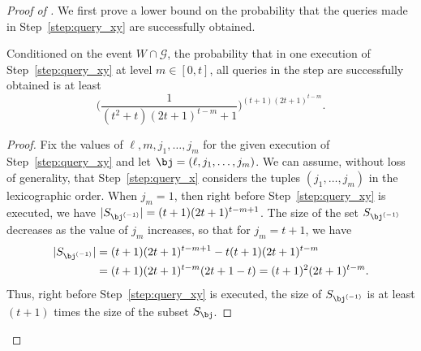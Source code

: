 \documentclass{toc}
\begin{document}
\begin{proof}[Proof of ]
    We first prove a lower bound on the probability that the queries made in Step~\ref{step:query_xy} are successfully obtained.
\begin{claim}\label{clm:connect}
Conditioned on the event $W\cap \mathcal{G}$, the probability that in one execution of Step~\ref{step:query_xy} at level $m \in [0,t]$, all queries in the step are successfully obtained is at least
\begin{equation*}
    \Big(\frac{1}{(t^2+t)(2t+1)^{t-m}+1} \Big)^{(t+1)(2t+1)^{t-m}}.
\end{equation*}
\end{claim}
\begin{proof}
Fix the values of $\ell,m, j_1, \dots, j_{m}$ for the given %
execution
of Step~\ref{step:query_xy} and let $\bj = (\ell,j_1, \dots, j_{m})$. 
We can assume, without loss of generality, that Step~\ref{step:query_x} considers the tuples $(j_1, \dots, j_m)$ in the lexicographic order.
When $j_m = 1$, then right before Step~\ref{step:query_xy} is executed, we have $|S_{\bj^{(-1)}}| = (t+1)(2t+1)^{t-m+1}$. The size of the set $S_{\bj^{(-1)}}$ decreases as the value of $j_m$ increases, so that for $j_m = t+1$, we have  
\begin{align}
    |S_{\bj^{(-1)}}| &= (t+1)(2t+1)^{t-m+1} - t(t+1)(2t+1)^{t-m} \nonumber \\
    &= (t+1)(2t+1)^{t-m}(2t+1-t) = (t+1)^2 (2t+1)^{t-m}.\nonumber
\end{align}
Thus, right before Step~\ref{step:query_xy} is executed, the size of  $S_{\bj^{(-1)}}$ is at least $(t+1)$ times the size of the subset $S_{\bj}$.  


\end{proof}
\end{proof}
\end{document}
